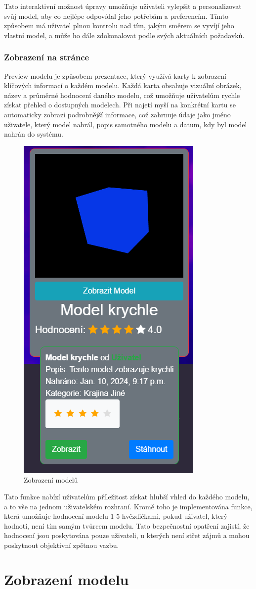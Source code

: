 \documentclass[12pt, a4paper,
twoside,        %
openright
]{report}
\begin{document}
Tato interaktivní možnost úpravy umožňuje uživateli vylepšit a personalizovat svůj model, aby co nejlépe odpovídal jeho potřebám a preferencím. Tímto způsobem má uživatel plnou kontrolu nad tím, jakým směrem se vyvíjí jeho vlastní model, a může ho dále zdokonalovat podle svých aktuálních požadavků.
\subsection[Zobrazení na stránce]{Zobrazení na stránce}
Preview modelu je způsobem prezentace, který využívá karty k zobrazení klíčových informací o každém modelu. Každá karta obsahuje vizuální obrázek, název a průměrné hodnocení daného modelu, což umožňuje uživatelům rychle získat přehled o dostupných modelech. Při najetí myší na konkrétní kartu se automaticky zobrazí podrobnější informace, což zahrnuje údaje jako jméno uživatele, který model nahrál, popis samotného modelu a datum, kdy byl model nahrán do systému.

\begin{figure}[h]
			\centering
			\includegraphics[width=0.3\linewidth]{image/model-view.png} 
			\caption{Zobrazení modelů}
		\end{figure}
		
Tato funkce nabízí uživatelům příležitost získat hlubší vhled do každého modelu, a to vše na jednom uživatelském rozhraní. Kromě toho je implementována funkce, která umožňuje hodnocení modelu 1-5 hvězdičkami, pokud uživatel, který hodnotí, není tím samým tvůrcem modelu. Tato bezpečnostní opatření zajistí, že hodnocení jsou poskytována pouze uživateli, u kterých není střet zájmů a mohou poskytnout objektivní zpětnou vazbu.
\newpage
\chapter[Zobrazení modelu]{Zobrazení modelu}
\end{document}

